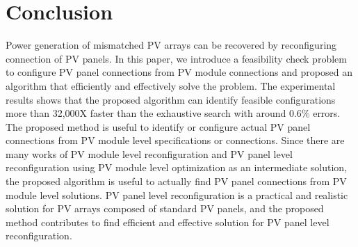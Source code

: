 \documentclass[conference]{pvsctran}
\begin{document}
\section{Conclusion}

Power generation of mismatched PV arrays can be recovered by reconfiguring connection of PV panels.
In this paper, we introduce a feasibility check problem to configure PV panel connections from PV module connections and proposed an algorithm that efficiently and effectively solve the problem. 
The experimental results shows that the proposed algorithm can identify feasible configurations more than 32,000X faster than the exhaustive search with around 0.6\% errors. 
The proposed method is useful to identify or configure actual PV panel connections from PV module level specifications or connections. 
Since there are many works of PV module level reconfiguration and PV panel level reconfiguration using PV module level optimization as an intermediate solution, the proposed algorithm is useful to actually find PV panel connections from PV module level solutions.
PV panel level reconfiguration is a practical and realistic solution for PV arrays composed of standard PV panels, 
and the proposed method contributes to find efficient and effective solution for PV panel level reconfiguration.











\renewcommand\refname{Reference}


%
%
%
\end{document}
